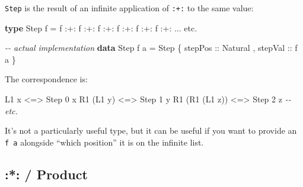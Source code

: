 \documentclass[]{article}
\newenvironment{Shaded}{}{}
\newcommand{\CommentTok}[1]{\textcolor[rgb]{0.38,0.63,0.69}{\textit{#1}}}
\newcommand{\DataTypeTok}[1]{\textcolor[rgb]{0.56,0.13,0.00}{#1}}
\newcommand{\DecValTok}[1]{\textcolor[rgb]{0.25,0.63,0.44}{#1}}
\newcommand{\KeywordTok}[1]{\textcolor[rgb]{0.00,0.44,0.13}{\textbf{#1}}}
\newcommand{\NormalTok}[1]{#1}
\newcommand{\OperatorTok}[1]{\textcolor[rgb]{0.40,0.40,0.40}{#1}}
\newcommand{\OtherTok}[1]{\textcolor[rgb]{0.00,0.44,0.13}{#1}}
\begin{document}
\begin{itemize}
  \texttt{Step} is the result of an infinite application of \texttt{:+:} to the
  same value:

\begin{Shaded}
\begin{Highlighting}[]
\KeywordTok{type} \DataTypeTok{Step}\NormalTok{ f }\OtherTok{=}\NormalTok{ f }\OperatorTok{:+:}\NormalTok{ f }\OperatorTok{:+:}\NormalTok{ f }\OperatorTok{:+:}\NormalTok{ f }\OperatorTok{:+:}\NormalTok{ f }\OperatorTok{:+:}\NormalTok{ f }\OperatorTok{:+:} \OperatorTok{...}\NormalTok{ etc}\OperatorTok{.}

\CommentTok{{-}{-} actual implementation}
\KeywordTok{data} \DataTypeTok{Step}\NormalTok{ f a }\OtherTok{=} \DataTypeTok{Step}
\NormalTok{  \{}\OtherTok{ stepPos ::} \DataTypeTok{Natural}
\NormalTok{  ,}\OtherTok{ stepVal ::}\NormalTok{ f a}
\NormalTok{  \}}
\end{Highlighting}
\end{Shaded}

  The correspondence is:

\begin{Shaded}
\begin{Highlighting}[]
\DataTypeTok{L1}\NormalTok{ x           }\OperatorTok{\textless{}=\textgreater{}} \DataTypeTok{Step} \DecValTok{0}\NormalTok{ x}
\DataTypeTok{R1}\NormalTok{ (}\DataTypeTok{L1}\NormalTok{ y)      }\OperatorTok{\textless{}=\textgreater{}} \DataTypeTok{Step} \DecValTok{1}\NormalTok{ y}
\DataTypeTok{R1}\NormalTok{ (}\DataTypeTok{R1}\NormalTok{ (}\DataTypeTok{L1}\NormalTok{ z)) }\OperatorTok{\textless{}=\textgreater{}} \DataTypeTok{Step} \DecValTok{2}\NormalTok{ z}
\CommentTok{{-}{-} etc.}
\end{Highlighting}
\end{Shaded}

  It's not a particularly useful type, but it can be useful if you want to
  provide an \texttt{f\ a} alongside ``which position'' it is on the infinite
  list.
\end{itemize}

\subsection{:*: / Product}\label{product}
\end{document}
